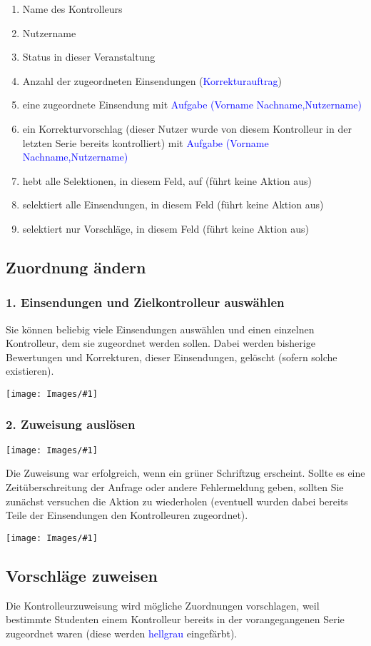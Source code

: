 \documentclass[a4paper,final]{scrartcl}
\numberwithin{equation}{section}
\newcommand{\blau}[1]{\textcolor{blue}{#1}}
\newenvironment{Bilder}
  {\par\raggedbottom\null\noindent\minipage{\textwidth}\centering}
  {\endminipage\vspace{0.7cm}}
\newcommand{\tbild}[1]{%
\begin{Bilder}
 \texttt{[image: Images/\#1]}
	\end{Bilder}
}
\begin{document}
\begin{enumerate}
\item Name des Kontrolleurs
\item Nutzername
\item Status in dieser Veranstaltung
\item Anzahl der zugeordneten Einsendungen (\blau{Korrekturauftrag})
\item eine zugeordnete Einsendung mit \blau{Aufgabe (Vorname Nachname,Nutzername)}
\item ein Korrekturvorschlag (dieser Nutzer wurde von diesem Kontrolleur in der letzten Serie bereits kontrolliert) mit \blau{Aufgabe (Vorname Nachname,Nutzername)}
\item hebt alle Selektionen, in diesem Feld, auf (führt keine Aktion aus)
\item selektiert alle Einsendungen, in diesem Feld (führt keine Aktion aus)
 \item selektiert nur Vorschläge, in diesem Feld (führt keine Aktion aus)
\end{enumerate}


\subsection{Zuordnung ändern}
\subsubsection*{1. Einsendungen und Zielkontrolleur auswählen}
Sie können beliebig viele Einsendungen auswählen und einen einzelnen Kontrolleur, dem sie zugeordnet werden sollen. Dabei werden bisherige Bewertungen und Korrekturen, dieser Einsendungen, gelöscht (sofern solche existieren). 
\tbild{manA.png}
\subsubsection*{2. Zuweisung auslösen}
\tbild{manB.png}
Die Zuweisung war erfolgreich, wenn ein grüner Schriftzug erscheint. Sollte es eine Zeitüberschreitung der Anfrage oder andere Fehlermeldung geben, sollten Sie zunächst versuchen die Aktion zu wiederholen (eventuell wurden dabei bereits Teile der Einsendungen den Kontrolleuren zugeordnet).
\tbild{manC.png}

\subsection{Vorschläge zuweisen}
Die Kontrolleurzuweisung wird mögliche Zuordnungen vorschlagen, weil bestimmte Studenten einem Kontrolleur bereits in der vorangegangenen Serie zugeordnet waren (diese werden \blau{hellgrau} eingefärbt).
\end{document}
